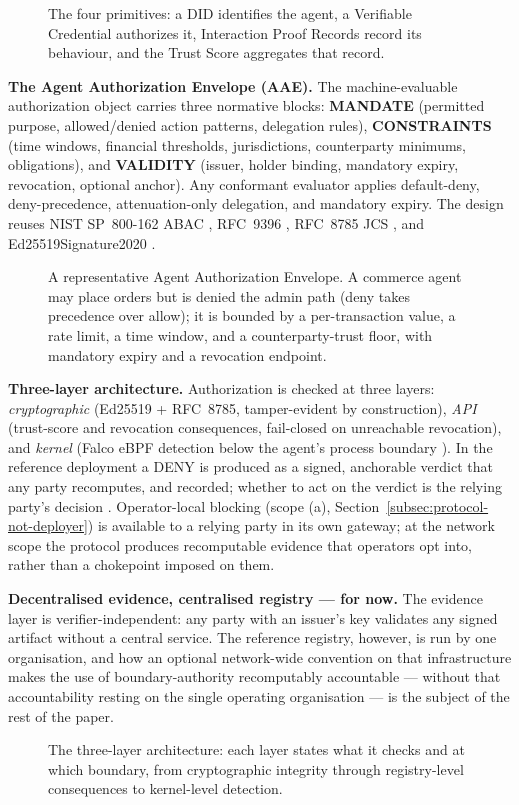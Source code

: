 \begin{figure}[tb]
\centering

\caption{The four primitives: a DID identifies the agent, a Verifiable Credential authorizes it, Interaction Proof Records record its behaviour, and the Trust Score aggregates that record.}
\label{fig:primitives}
\end{figure}

\textbf{The Agent Authorization Envelope (AAE).} The machine-evaluable authorization object carries three normative blocks: \textbf{MANDATE} (permitted purpose, allowed/denied action patterns, delegation rules), \textbf{CONSTRAINTS} (time windows, financial thresholds, jurisdictions, counterparty minimums, obligations), and \textbf{VALIDITY} (issuer, holder binding, mandatory expiry, revocation, optional anchor). Any conformant evaluator applies default-deny, deny-precedence, attenuation-only delegation, and mandatory expiry. The design reuses NIST SP~800-162 ABAC \cite{ref29_abac}, RFC~9396 \cite{ref30_rar}, RFC~8785 JCS \cite{ref31_jcs}, and Ed25519Signature2020 \cite{ref32_ed25519}.

\begin{figure}[tb]

\caption{A representative Agent Authorization Envelope. A commerce agent may place orders but is denied the admin path (deny takes precedence over allow); it is bounded by a per-transaction value, a rate limit, a time window, and a counterparty-trust floor, with mandatory expiry and a revocation endpoint.}
\label{lst:aae}
\end{figure}

\textbf{Three-layer architecture.} Authorization is checked at three layers: \emph{cryptographic} (Ed25519 + RFC~8785, tamper-evident by construction), \emph{API} (trust-score and revocation consequences, fail-closed on unreachable revocation), and \emph{kernel} (Falco eBPF detection below the agent's process boundary \cite{ref13_falcobridge}). In the reference deployment a DENY is produced as a signed, anchorable verdict that any party recomputes, and recorded; whether to act on the verdict is the relying party's decision \cite{ref28_techspec}. Operator-local blocking (scope (a), Section~\ref{subsec:protocol-not-deployer}) is available to a relying party in its own gateway; at the network scope the protocol produces recomputable evidence that operators opt into, rather than a chokepoint imposed on them.

\textbf{Decentralised evidence, centralised registry — for now.} The evidence layer is verifier-independent: any party with an issuer's key validates any signed artifact without a central service. The reference registry, however, is run by one organisation, and how an optional network-wide convention on that infrastructure makes the use of boundary-authority recomputably accountable — without that accountability resting on the single operating organisation — is the subject of the rest of the paper.

\begin{figure}[b]
\centering

\caption{The three-layer architecture: each layer states what it checks and at which boundary, from cryptographic integrity through registry-level consequences to kernel-level detection.}
\label{fig:three-layer}
\end{figure}
